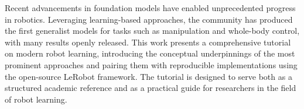 Recent advancements in foundation models have enabled unprecedented progress in robotics.
Leveraging learning-based approaches, the community has produced the first generalist models for tasks such as manipulation and whole-body control, with many results openly released.
This work presents a comprehensive tutorial on modern robot learning, introducing the conceptual underpinnings of the most prominent approaches and pairing them with reproducible implementations using the open-source LeRobot framework.
The tutorial is designed to serve both as a structured academic reference and as a practical guide for researchers in the field of robot learning.